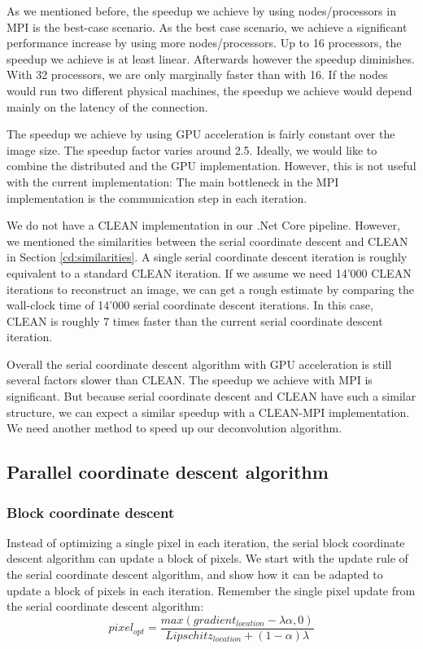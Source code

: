As we mentioned before, the speedup we achieve by using nodes/processors in MPI is the best-case scenario. As the best case scenario, we achieve a significant performance increase by using more nodes/processors. Up to 16 processors, the speedup we achieve is at least linear. Afterwards however the speedup diminishes. With 32 processors, we are only marginally faster than with 16. If the nodes would run two different physical machines, the speedup we achieve would depend mainly on the latency of the connection. 

The speedup we achieve by using GPU acceleration is fairly constant over the image size. The speedup factor varies around 2.5. Ideally, we would like to combine the distributed and the GPU implementation. However, this is not useful with the current implementation: The main bottleneck in the MPI implementation is the communication step in each iteration. 

We do not have a CLEAN implementation in our .Net Core pipeline. However, we mentioned the similarities between the serial coordinate descent and CLEAN in Section \ref{cd:similarities}. A single serial coordinate descent iteration is roughly equivalent to a standard CLEAN iteration. If we assume we need 14'000 CLEAN iterations to reconstruct an image, we can get a rough estimate by comparing the wall-clock time of 14'000 serial coordinate descent iterations. In this case, CLEAN is roughly 7 times faster than the current serial coordinate descent iteration.

Overall the serial coordinate descent algorithm with GPU acceleration is still several factors slower than CLEAN. The speedup we achieve with MPI is significant. But because serial coordinate descent and CLEAN have such a similar structure, we can expect a similar speedup with a CLEAN-MPI implementation. We need another method to speed up our deconvolution algorithm.


\subsection*{Parallel coordinate descent algorithm}

\subsubsection*{Block coordinate descent}
Instead of optimizing a single pixel in each iteration, the serial block coordinate descent algorithm can update a block of pixels. We start with the update rule of the serial coordinate descent algorithm, and show how it can be adapted to update a block of pixels in each iteration. Remember the single pixel update from the serial coordinate descent algorithm: 
\begin{equation} \label{pcdm:pcdm:block:single:update}
pixel_{opt} = \frac{max(gradient_{location} - \lambda\alpha, 0)}{Lipschitz_{location} + (1 - \alpha)\lambda}
\end{equation}

